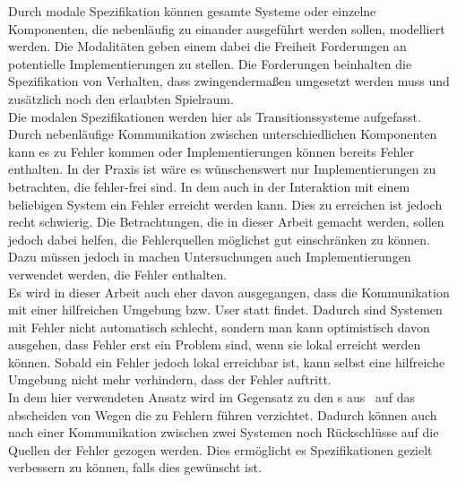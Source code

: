 Durch modale Spezifikation können gesamte Systeme oder einzelne Komponenten,
die nebenläufig zu einander ausgeführt werden sollen, modelliert werden. Die
Modalitäten geben einem dabei die Freiheit Forderungen an potentielle
Implementierungen zu stellen. Die Forderungen beinhalten die Spezifikation von
Verhalten, dass zwingendermaßen umgesetzt werden muss und zusätzlich noch den
erlaubten Spielraum.\\
Die modalen Spezifikationen werden hier als Transitionssysteme aufgefasst.\\
Durch nebenläufige Kommunikation zwischen unterschiedlichen Komponenten kann es
zu Fehler kommen oder Implementierungen können bereits Fehler enthalten. In der
Praxis ist wäre es wünschenswert nur Implementierungen zu betrachten, die
fehler-frei sind. In dem auch in der Interaktion mit einem beliebigen System
ein Fehler erreicht werden kann. Dies zu erreichen ist jedoch recht schwierig.
Die Betrachtungen, die in dieser Arbeit gemacht werden, sollen jedoch dabei
helfen, die Fehlerquellen möglichst gut einschränken zu können. Dazu müssen
jedoch in machen Untersuchungen auch Implementierungen verwendet werden, die
Fehler enthalten.\\
Es wird in dieser Arbeit auch eher davon ausgegangen, dass die Kommunikation
mit einer hilfreichen Umgebung bzw. User statt findet. Dadurch sind Systemen
mit Fehler nicht automatisch schlecht, sondern man kann optimistisch davon
ausgehen, dass Fehler erst ein Problem sind, wenn sie lokal erreicht werden
können. Sobald ein Fehler jedoch lokal erreichbar ist, kann selbst eine
hilfreiche Umgebung nicht mehr verhindern, dass der Fehler auftritt.\\
In dem hier verwendeten Ansatz wird im Gegensatz zu den \MIA{}s
aus~\cite{Vogler2016MIA3} auf das abscheiden von Wegen die zu Fehlern führen
verzichtet. Dadurch können auch nach einer Kommunikation zwischen zwei Systemen
noch Rückschlüsse auf die Quellen der Fehler gezogen werden. Dies ermöglicht es
Spezifikationen gezielt verbessern zu können, falls dies gewünscht ist.
